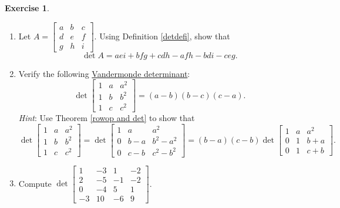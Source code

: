 \documentclass[12pt,letterpaper]{book}
\numberwithin{equation}{section}
\theoremstyle{definition}
\newtheorem{exercise}{\textbf{Exercise}}[chapter]
\begin{document}
\begin{exercise}\label{det exer}\quad
\begin{enumerate}[\bfseries 1.]

\item\label{3by3det} Let $A=\left[\begin{array}{ccc} a & b & c \\ d & e & f \\ g & h & i \end{array}\right]$. Using Definition \ref{detdefi}, show that
$$\det A=aei+bfg+cdh-afh-bdi-ceg.$$

\item Verify the following \underline{Vandermonde determinant}:
$$\det\left[\begin{array}{ccc} 1 & a & a^2 \\ 1 & b & b^2 \\ 1 & c & c^2 \end{array}\right]=(a-b)(b-c)(c-a).$$
\textit{Hint}: Use Theorem \ref{rowop and det} to show that
$$\det\left[\begin{array}{ccc} 1 & a & a^2 \\ 1 & b & b^2 \\ 1 & c & c^2 \end{array}\right]=\det\left[\begin{array}{ccc} 1 & a & a^2 \\ 0 & b-a & b^2-a^2 \\ 0 & c-b & c^2-b^2 \end{array}\right]=(b-a)(c-b)\det\left[\begin{array}{ccc} 1 & a & a^2 \\ 0 & 1 & b+a \\ 0 & 1 & c+b \end{array}\right].$$

\item Compute $\det \left[\begin{array}{rrrr} 1 & -3 & 1 & -2
\\ 2 & -5 & -1 & -2 \\ 0 & -4 & 5 & 1 \\ -3 & 10 & -6 & 9
\end{array}\right]$.


\end{enumerate}
\end{exercise}
\end{document}
